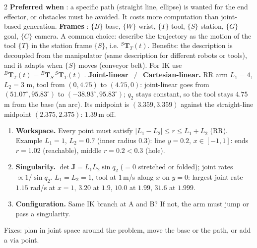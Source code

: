\begin{multicols}{2}
\nopagebreak[4]
\textbf{Preferred when} : a specific path (straight line, ellipse) is wanted for the end effector, or obstacles must be avoided. It costs more computation than joint-based generation.
\textbf{Frames} : $\{B\}$ base, $\{W\}$ wrist, $\{T\}$ tool, $\{S\}$ station, $\{G\}$ goal, $\{C\}$ camera. A common choice: describe the trajectory as the motion of the tool $\{T\}$ in the station frame $\{S\}$, i.e. ${}^S\mathbf T_T(t)$. Benefits: the description is decoupled from the manipulator (same description for different robots or tools), and it adapts when $\{S\}$ moves (conveyor belt). For IK use ${}^B\mathbf T_T(t)={}^B\mathbf T_S\,{}^S\mathbf T_T(t)$ \added.
\textbf{Joint-linear $\neq$ Cartesian-linear.} RR arm $L_1{=}4$, $L_2{=}3$ m, tool from $(0,4.75)$ to $(4.75,0)$: joint-linear goes from $(51.07^\circ,95.83^\circ)$ to $(-38.93^\circ,95.83^\circ)$; $q_2$ stays constant, so the tool stays $4.75$\,m from the base (an arc). Its midpoint is $(3.359,3.359)$ against the straight-line midpoint $(2.375,2.375)$: $1.39$\,m off. \chk
{}\nopagebreak[4]
\begin{recipe}
\begin{enumerate}
\item \textbf{Workspace.} Every point must satisfy $|L_1-L_2|\le r\le L_1+L_2$ (RR). Example $L_1{=}1$, $L_2{=}0.7$ (inner radius $0.3$): line $y=0.2$, $x\in[-1,1]$: ends $r=1.02$ (reachable), middle $r=0.2<0.3$ (hole). \chk
\item \textbf{Singularity.} $\det\mathbf J=L_1L_2\sin q_2$ ($=0$ stretched or folded); joint rates $\propto1/\sin q_2$. $L_1{=}L_2{=}1$, tool at $1$\,m/s along $x$ on $y{=}0$: largest joint rate $1.15$ rad/s at $x{=}1$, $3.20$ at $1.9$, $10.0$ at $1.99$, $31.6$ at $1.999$. \chk
\item \textbf{Configuration.} Same IK branch at A and B? If not, the arm must jump or pass a singularity.
\end{enumerate}
Fixes: plan in joint space around the problem, move the base or the path, or add a via point.
\end{recipe}


\end{multicols}
